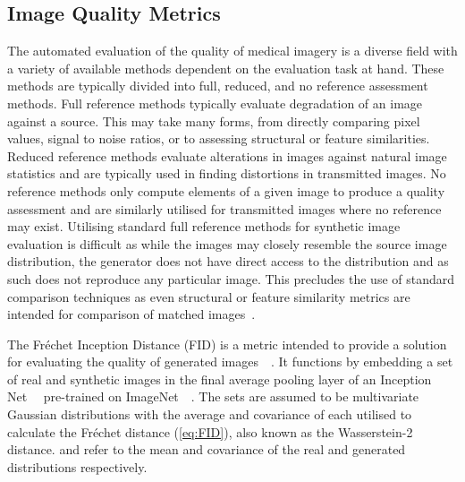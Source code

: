 \documentclass{article}
\begin{document}
\subsection{Image Quality Metrics}
The automated evaluation of the quality of medical imagery is a diverse field with a variety of available methods dependent on the evaluation task at hand. These methods are typically divided into full, reduced, and no reference assessment methods. Full reference methods typically evaluate degradation of an image against a source. This may take many forms, from directly comparing pixel values, signal to noise ratios, or to assessing structural or feature similarities. Reduced reference methods evaluate alterations in images against natural image statistics and are typically used in finding distortions in transmitted images. No reference methods only compute elements of a given image to produce a quality assessment and are similarly utilised for transmitted images where no reference may exist. Utilising standard full reference methods for synthetic image evaluation is difficult as while the images may closely resemble the source image distribution, the generator does not have direct access to the distribution and as such does not reproduce any particular image. This precludes the use of standard comparison techniques as even structural or feature similarity metrics are intended for comparison of matched images~\cite{thankiMedicalImagingIts2018}. 

The Fréchet Inception Distance (FID) is a metric intended to provide a solution for evaluating the quality of generated images~~\cite{heuselGANsTrainedTwo2018}. It functions by embedding a set of real and synthetic images in the final average pooling layer of an Inception Net~~\cite{szegedyRethinkingInceptionArchitecture2015} pre-trained on ImageNet~~\cite{russakovskyImageNetLargeScale2015}. The sets are assumed to be multivariate Gaussian distributions with the average and covariance of each utilised to calculate the Fréchet distance (\ref{eq:FID}), also known as the Wasserstein-2 distance.  and  refer to the mean and covariance of the real and generated distributions respectively.
\end{document}
